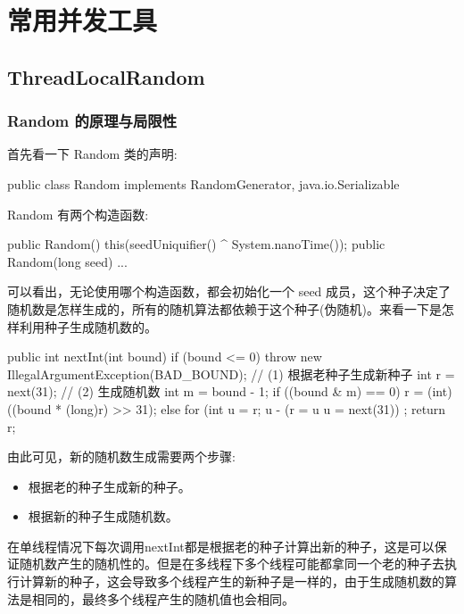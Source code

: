 \section{常用并发工具}
\subsection{ThreadLocalRandom}
\subsubsection{Random 的原理与局限性}

首先看一下 Random 类的声明:

\begin{Java}
public class Random implements RandomGenerator, java.io.Serializable
\end{Java}

Random 有两个构造函数:

\begin{Java}
public Random() {
    this(seedUniquifier() ^ System.nanoTime());
}
public Random(long seed) {
    ...
}
\end{Java}

可以看出，无论使用哪个构造函数，都会初始化一个 seed 成员，这个种子决定了随机数是怎样生成的，所有的随机算法都依赖于这个种子(伪随机)。来看一下是怎样利用种子生成随机数的。

\begin{Java}
public int nextInt(int bound) {
    if (bound <= 0)
        throw new IllegalArgumentException(BAD_BOUND);
    // (1) 根据老种子生成新种子
    int r = next(31);
    // (2) 生成随机数
    int m = bound - 1;
    if ((bound & m) == 0) 
        r = (int)((bound * (long)r) >> 31);
    else {
        for (int u = r;
             u - (r = u %
             u = next(31))
            ;
    }
    return r;
}
\end{Java}

由此可见，新的随机数生成需要两个步骤:
\begin{itemize}
    \item 根据老的种子生成新的种子。
    \item 根据新的种子生成随机数。
\end{itemize}

在单线程情况下每次调用nextInt都是根据老的种子计算出新的种子，这是可以保证随机数产生的随机性的。但是在多线程下多个线程可能都拿同一个老的种子去执行计算新的种子，这会导致多个线程产生的新种子是一样的，由于生成随机数的算法是相同的，最终多个线程产生的随机值也会相同。

